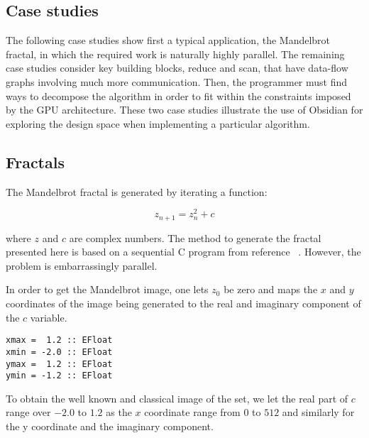 \subsection{Case studies} 
\label{sec:CASESTUDIES}


The following case studies show first a typical application, the Mandelbrot 
fractal, in which the required work is naturally highly parallel.
The remaining case studies consider key building blocks, reduce and scan, 
that have data-flow graphs involving much more communication. Then, the 
programmer must find ways to decompose the algorithm in order to fit within
the constraints imposed by the GPU architecture. These two case studies illustrate 
the use of Obsidian for exploring the design space when implementing a particular algorithm.

\subsection{Fractals} 

The Mandelbrot fractal is generated by iterating a function: 

\begin{equation*} 
 z_{n+1} = z_n^2 + c
\end{equation*} 

\noindent where $z$ and $c$ are complex numbers. The method to generate the fractal 
presented here is based on a sequential C program from reference 
~. However, the problem is embarrassingly parallel.

In order to get the Mandelbrot image, one lets $z_0$ be zero and maps the 
$x$ and $y$ coordinates of the image being generated to the real and imaginary 
component of the $c$ variable.

\begin{small}
\begin{verbatim} 
xmax =  1.2 :: EFloat
xmin = -2.0 :: EFloat
ymax =  1.2 :: EFloat
ymin = -1.2 :: EFloat
\end{verbatim}
\end{small} 

To obtain the well known and classical image of the set, we let 
the real part of $c$ range over $-2.0$ to $1.2$ as the $x$ coordinate range from
$0$ to $512$ and similarly for the y coordinate and the imaginary component.  

